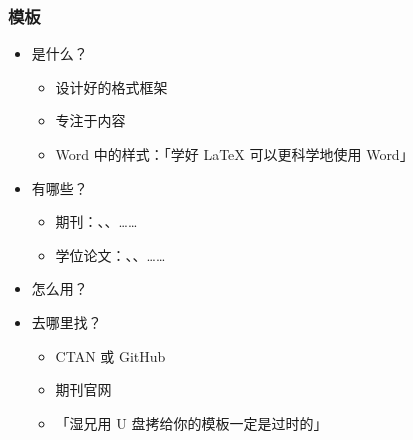 \begin{frame}[fragile]
\frametitle{模板}
\begin{itemize}
  \item<+-> 是什么？
    \begin{itemize}
      \item 设计好的格式框架
      \item 专注于内容
      \item Word 中的样式：「学好 \LaTeX{} 可以更科学地使用 Word」
    \end{itemize}
  \item<+-> 有哪些？
    \begin{itemize}
      \item 期刊：、、……
      \item 学位论文：、、\alert{}……
    \end{itemize}
  \item<+-> 怎么用？
  \item<+-> 去哪里找？
    \begin{itemize}
      \item CTAN  或 GitHub \href{https://github.com}{\faGithub}
      \item 期刊官网
      \item 「湿兄用 U 盘拷给你的模板一定是过时的」
    \end{itemize}
\end{itemize}
\end{frame}
